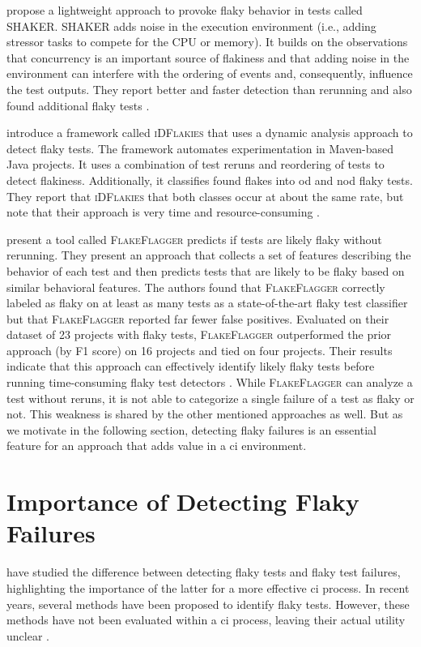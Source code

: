  propose a lightweight approach to provoke flaky behavior in tests called \textsc{SHAKER}.
\textsc{SHAKER} adds noise in the execution environment (i.e., adding stressor tasks to compete for the CPU or memory).
It builds on the observations that concurrency is an important source of flakiness and that adding noise in the environment can interfere with the ordering of events and, consequently, influence the test outputs.
They report better and faster detection than rerunning and also found additional flaky tests \autocite{silva_shake_2020}.

 introduce a framework called \textsc{iDFlakies} that uses a dynamic analysis approach to detect flaky tests.
The framework automates experimentation in Maven-based Java projects.
It uses a combination of test reruns and reordering of tests to detect flakiness.
Additionally, it classifies found flakes into \ac{od} and \ac{nod} flaky tests.
They report that \textsc{iDFlakies} that both classes occur at about the same rate, but note that their approach is very time and resource-consuming \autocite{lam_idflakies_2019}.

 present a tool called \textsc{FlakeFlagger} predicts if tests are likely flaky without rerunning.
They present an approach that collects a set of features describing the behavior of each test and then predicts tests that are likely to be flaky based on similar behavioral features.
The authors found that \textsc{FlakeFlagger} correctly labeled as flaky on at least as many tests as a state-of-the-art flaky test classifier but that \textsc{FlakeFlagger} reported far fewer false positives.
Evaluated on their dataset of 23 projects with flaky tests, \textsc{FlakeFlagger} outperformed the prior approach (by F1 score) on 16 projects and tied on four projects.
Their results indicate that this approach can effectively identify likely flaky tests before running time-consuming flaky test detectors \autocite{alshammari_flakeflagger_2021}.
While \textsc{FlakeFlagger} can analyze a test without reruns, it is not able to categorize a single failure of a test as flaky or not.
This weakness is shared by the other mentioned approaches as well.
But as we motivate in the following section, detecting flaky failures is an essential feature for an approach that adds value in a \ac{ci} environment.

\section{Importance of Detecting Flaky Failures}
 have studied the difference between detecting flaky tests and flaky test failures, highlighting the importance of the latter for a more effective \ac{ci} process.
In recent years, several methods have been proposed to identify flaky tests.
However, these methods have not been evaluated within a \ac{ci} process, leaving their actual utility unclear \autocite{haben_importance_2023}.

